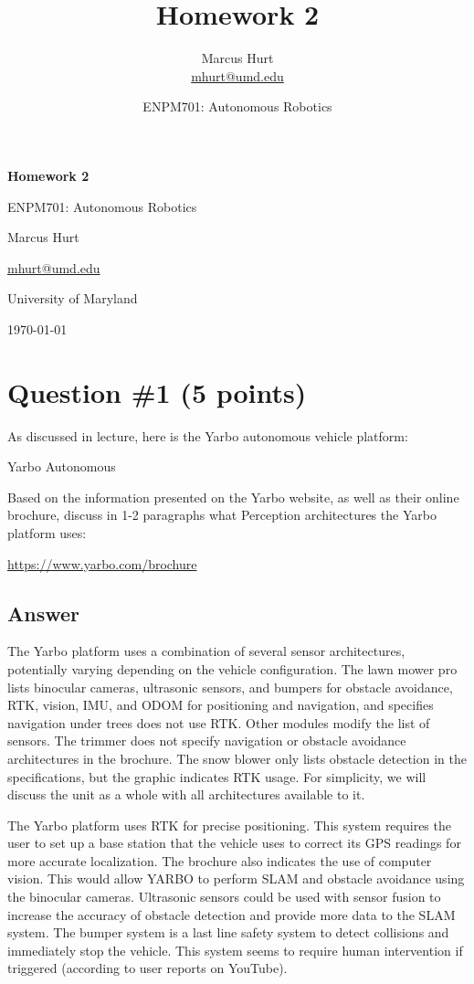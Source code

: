 \documentclass[11pt]{article}
\title{Homework 2}
\author{Marcus Hurt \\ \href{mailto:mhurt@umd.edu}{mhurt@umd.edu}}
\date{ENPM701: Autonomous Robotics}
\begin{document}
\begin{titlepage}
    \centering
    \vspace*{2in}
    {\LARGE\bfseries Homework 2\par}
    \vspace{0.5in}
    {\Large ENPM701: Autonomous Robotics\par}
    \vspace{1in}
    {\large Marcus Hurt\par}
    \href{mailto:mhurt@umd.edu}{mhurt@umd.edu}
    \vfill
    {\large University of Maryland\par}
    {\large \today\par}
\end{titlepage}

\section*{Question \#1 (5 points)}

As discussed in lecture, here is the Yarbo autonomous
vehicle platform:

Yarbo Autonomous

Based on the information presented on the Yarbo website, as well as their online brochure, discuss in 1-2 paragraphs what Perception architectures the Yarbo platform uses:

\url{https://www.yarbo.com/brochure}

\subsection*{Answer}

The Yarbo platform uses a combination of several sensor architectures, potentially varying depending on the vehicle configuration. The lawn mower pro lists binocular cameras, ultrasonic sensors, and bumpers for obstacle avoidance, RTK, vision, IMU, and ODOM for positioning and navigation, and specifies navigation under trees does not use RTK. Other modules modify the list of sensors. The trimmer does not specify navigation or obstacle avoidance architectures in the brochure. The snow blower only lists obstacle detection in the specifications, but the graphic indicates RTK usage. For simplicity, we will discuss the unit as a whole with all architectures available to it.

The Yarbo platform uses RTK for precise positioning. This system requires the user to set up a base station that the vehicle uses to correct its GPS readings for more accurate localization. The brochure also indicates the use of computer vision. This would allow YARBO to perform SLAM and obstacle avoidance using the binocular cameras. Ultrasonic sensors could be used with sensor fusion to increase the accuracy of obstacle detection and provide more data to the SLAM system. The bumper system is a last line safety system to detect collisions and immediately stop the vehicle. This system seems to require human intervention if triggered (according to user reports on YouTube).
\end{document}
